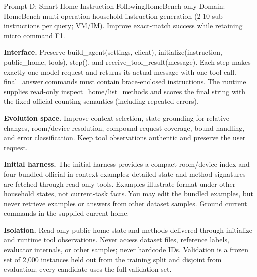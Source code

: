 \documentclass[11pt,a4paper]{article}
\newcommand{\phead}[1]{{\color{lopdteal!85!black}\bfseries #1}}
\begin{document}
\begin{promptbox}{Prompt D: Smart-Home Instruction Following}{HomeBench only}
Domain: HomeBench multi-operation household instruction generation (2-10 sub-instructions per query; VM/IM). Improve exact-match success while retaining micro command F1.

\smallskip
\phead{Interface.} Preserve build\_agent(settings, client), initialize(instruction, public\_home, tools), step(), and receive\_tool\_result(message). Each step makes exactly one model request and returns its actual message with one tool call. final\_answer.commands must contain brace-enclosed instructions. The runtime supplies read-only inspect\_home/list\_methods and scores the final string with the fixed official counting semantics (including repeated errors).

\smallskip
\phead{Evolution space.} Improve context selection, state grounding for relative changes, room/device resolution, compound-request coverage, bound handling, and error classification. Keep tool observations authentic and preserve the user request.

\smallskip
\phead{Initial harness.} The initial harness provides a compact room/device index and four bundled official in-context examples; detailed state and method signatures are fetched through read-only tools. Examples illustrate format under other household states, not current-task facts. You may edit the bundled examples, but never retrieve examples or answers from other dataset samples. Ground current commands in the supplied current home.

\smallskip
\phead{Isolation.} Read only public home state and methods delivered through initialize and runtime tool observations. Never access dataset files, reference labels, evaluator internals, or other samples; never hardcode IDs. Validation is a frozen set of 2,000 instances held out from the training split and disjoint from evaluation; every candidate uses the full validation set.
\end{promptbox}
\end{document}
